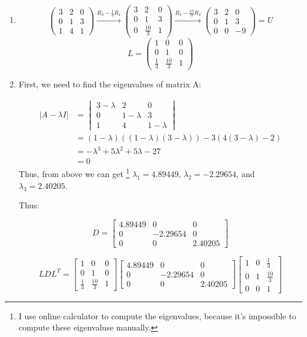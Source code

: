 \documentclass[11pt]{article} %
\begin{document}
\begin{enumerate}
	\item 
$$\begin{pmatrix}
	3&2&0\\0&1&3\\1&4&1
\end{pmatrix}\xrightarrow{R_3-\frac{1}{3}R_1}\begin{pmatrix}
3&2&0\\0&1&3\\0&\frac{10}{3}&1
\end{pmatrix}\xrightarrow{R_3-\frac{10}{3}R_2}\begin{pmatrix}
3&2&0\\0&1&3\\0&0&-9
\end{pmatrix}=U$$
$$L=\begin{pmatrix}
	1&0&0\\0&1&0\\\frac{1}{3}&\frac{10}{3}&1
\end{pmatrix}$$


\item 

First, we need to find the eigenvalues of matrix A:

\begin{align*}
	|A-\lambda I|&=\begin{vmatrix}
		3-\lambda&2&0\\
		0&1-\lambda&3\\
		1&4&1-\lambda
	\end{vmatrix}\\
&=(1-\lambda)((1-\lambda)(3-\lambda))-3(4(3-\lambda)-2)\\
&=-\lambda^3+5\lambda^2+5\lambda-27\\
&=0
\end{align*}
Thus, from above we can get \footnote{I use online calculator to compute the eigenvalues, because it's impossible to compute these eigenvaluse manually. } $\lambda_1=4.89449$, $\lambda_2=-2.29654$, and $\lambda_3=2.40205$.

Thus:

$$D=\begin{bmatrix}
	4.89449&0&0\\0&-2.29654&0\\0&0&2.40205
\end{bmatrix}$$

$$LDL^T=\begin{bmatrix}
	1&0&0\\0&1&0\\\frac{1}{3}&\frac{10}{3}&1
\end{bmatrix}\begin{bmatrix}
	4.89449&0&0\\0&-2.29654&0\\0&0&2.40205
\end{bmatrix}\begin{bmatrix}
1&0&\frac{1}{3}\\0&1&\frac{10}{3}\\0&0&1
\end{bmatrix}$$


\end{enumerate}
\end{document}
